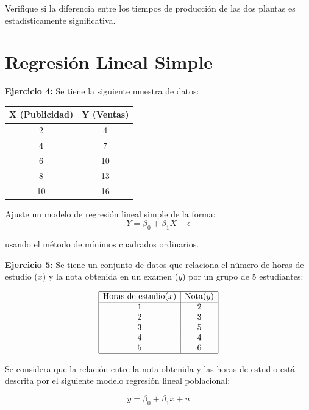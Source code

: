 \documentclass[10pt,a4paper]{article}
\begin{document}
 Verifique si la diferencia entre los tiempos de producción de las dos plantas es estadísticamente significativa.


\section{Regresión Lineal Simple}

\textbf{Ejercicio 4:} Se tiene la siguiente muestra de datos:
\begin{center}
\begin{tabular}{|c|c|}
\hline
X (Publicidad) & Y (Ventas) \\
\hline
2 & 4 \\
\hline
4 & 7 \\
\hline
6 & 10 \\
\hline
8 & 13 \\
\hline
10 & 16 \\
\hline
\end{tabular}
\end{center}

Ajuste un modelo de regresión lineal simple de la forma:
$$Y = \beta_0 + \beta_1 X + \epsilon $$

usando el método de mínimos cuadrados ordinarios.
\vspace{0.5cm}


\textbf{Ejercicio 5:} 
Se tiene un conjunto de datos que relaciona el número de horas de estudio (\(x\)) y la nota obtenida en un examen (\(y\)) por un grupo de 5 estudiantes:

\[
\begin{array}{|c|c|}
\hline
\text{Horas de estudio} (x) & \text{Nota} (y) \\
\hline
1 & 2 \\
2 & 3 \\
3 & 5 \\
4 & 4 \\
5 & 6 \\
\hline
\end{array}
\]

Se considera que la relación entre la nota obtenida y las horas de estudio 
est\'a descrita por el siguiente modelo regresión lineal poblacional:

\[
y = \beta_0 + \beta_1 x+u
\]
\end{document}
